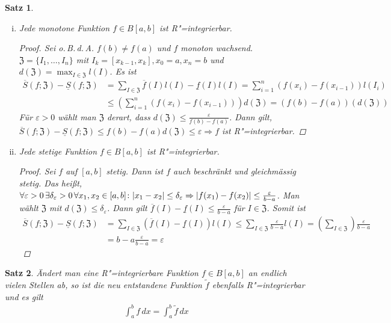 \documentclass[ngerman,titlepage,twoside, parskip=half*]{scrreprt}
\newcommand*{\ZZ}{\mathfrak{Z}}
\theoremstyle{break}
\newtheorem{theorem}{Satz}[section]
\theoremstyle{nonumberbreak}
\newtheorem{proof}{Beweis:}
\DeclarePairedDelimiter{\abs}{\lvert}{\rvert}
\begin{document}
\begin{theorem}
  \begin{enumerate}[(i)]
  \item Jede \emph{monotone} Funktion $f\in B[a,b]$ ist
    R"=integrierbar.
    \begin{proof}
      Sei o.\,B.\,d.\,A. $f(b)\neq f(a)$ und $f$ monoton wachsend.
      $\ZZ=\{I_1,\dots,I_n\}$ mit $I_k=[x_{k-1},x_k], x_0=a,x_n=b$ und $d (
      \ZZ)= \max_{I\in\ZZ} l (I)$. Es ist
      \begin{align*}
        \overline{S}(f;\ZZ)-\underline{S}(f;\ZZ) &= \sum_{I\in\ZZ}
        \overline{f}(I) l(I)-\underline{f}(I)l(I) = \sum_{i=1}^n
        (f(x_i)-f(x_{i-1}))l(I_i)\\
        &\leq \left( \sum_{i=1}^n (f(x_i)-f(x_{i-1})) \right)d(\ZZ)=
        (f(b)-f(a))(d(\ZZ))
      \end{align*}
      Für $\varepsilon>0$ wählt man $\ZZ$ derart, dass $d(\ZZ)\leq
      \frac{\varepsilon}{f(b)-f(a)}$. Dann gilt, $\overline{S}(f;\ZZ)-
      \underline{S}(f;\ZZ)\leq f(b)-f(a)d(\ZZ)\leq \varepsilon\Rightarrow f$
      ist R"=integrierbar.
    \end{proof}

    \item Jede \emph{stetige} Funktion $f\in B[a,b]$ ist
      R"=integrierbar.
      \begin{proof}
        Sei $f$ auf $[a,b]$ stetig. Dann ist $f$ auch beschränkt
        und gleichmässig stetig. Das heißt, 
        $\forall\varepsilon>0\,\exists\delta_\varepsilon>0\,\forall
        x_1, x_2\in [a,b]\colon \abs{x_1-x_2}\leq \delta_\varepsilon
        \Rightarrow\abs{f(x_1)-f(x_2)}\leq
        \frac{\varepsilon}{b-a}$. Man wählt $\ZZ$ mit $d(\ZZ)\leq 
        \delta_\varepsilon$. Dann gilt $\overline{f}(I)-\underline{f}(I)\leq
        \frac{\varepsilon}{b-a}$ für $I \in\ZZ$. Somit ist
        \begin{align*}
          \overline{S}(f;\ZZ)-\underline{S}(f;\ZZ)&= \sum_{I\in\ZZ}
          (\overline{f}(I)-\underline{f}(I))l(I)\leq \sum_{I\in\ZZ}
          \frac{\varepsilon}{b-a} l(I)=\left( \sum_{I\in\ZZ} 
          \right)\frac{\varepsilon}{b-a}\\
          &= b-a\frac{\varepsilon}{b-a}=\varepsilon
        \end{align*}
      \end{proof}
  \end{enumerate}
\end{theorem}

\begin{theorem}
  Ändert man eine R"=integrierbare Funktion $f\in B[a,b]$ an endlich vielen
  Stellen ab, so ist die neu entstandene Funktion $\tilde{f}$ ebenfalls
  R"=integrierbar und es gilt
  \begin{gather*}
    \int_a^b f\,dx = \int_a^b \tilde{f}\,dx
  \end{gather*}
\end{theorem}
\end{document}
